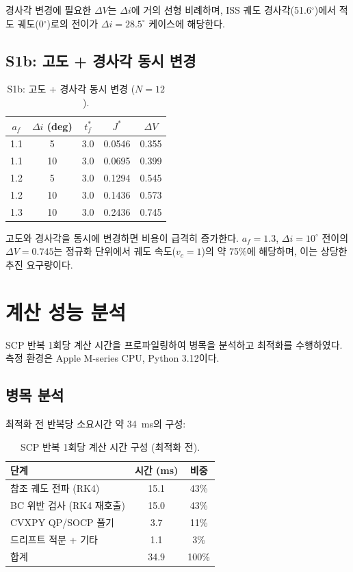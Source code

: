 \documentclass[11pt]{article}
\begin{document}
경사각 변경에 필요한 $\Delta V$는 $\Delta i$에 거의 선형 비례하며,
ISS 궤도 경사각(51.6$^\circ$)에서 적도 궤도(0$^\circ$)로의 전이가
$\Delta i = 28.5^\circ$ 케이스에 해당한다.

\subsection{S1b: 고도 + 경사각 동시 변경}

\begin{table}[h]
\centering
\caption{S1b: 고도 + 경사각 동시 변경 ($N=12$).}
\label{tab:s1b}
\small
\begin{tabular}{@{}ccccc@{}}
\toprule
$a_f$ & $\Delta i$ (deg) & $t_f^*$ & $J^*$ & $\Delta V$ \\
\midrule
1.1 & 5  & 3.0 & 0.0546 & 0.355 \\
1.1 & 10 & 3.0 & 0.0695 & 0.399 \\
1.2 & 5  & 3.0 & 0.1294 & 0.545 \\
1.2 & 10 & 3.0 & 0.1436 & 0.573 \\
1.3 & 10 & 3.0 & 0.2436 & 0.745 \\
\bottomrule
\end{tabular}
\end{table}

고도와 경사각을 동시에 변경하면 비용이 급격히 증가한다.
$a_f=1.3$, $\Delta i=10^\circ$ 전이의 $\Delta V = 0.745$는
정규화 단위에서 궤도 속도($v_c = 1$)의 약 75\%에 해당하며,
이는 상당한 추진 요구량이다.

\section{계산 성능 분석}
\label{sec:performance}

SCP 반복 1회당 계산 시간을 프로파일링하여 병목을 분석하고
최적화를 수행하였다. 측정 환경은 Apple M-series CPU, Python 3.12이다.

\subsection{병목 분석}

최적화 전 반복당 소요시간 약 \SI{34}{\ms}의 구성:

\begin{table}[h]
\centering
\caption{SCP 반복 1회당 계산 시간 구성 (최적화 전).}
\label{tab:perf-before}
\small
\begin{tabular}{@{}lcc@{}}
\toprule
단계 & 시간 (ms) & 비중 \\
\midrule
참조 궤도 전파 (RK4)    & 15.1 & 43\% \\
BC 위반 검사 (RK4 재호출) & 15.0 & 43\% \\
CVXPY QP/SOCP 풀기       & 3.7  & 11\% \\
드리프트 적분 + 기타      & 1.1  & 3\% \\
\midrule
합계                      & 34.9 & 100\% \\
\bottomrule
\end{tabular}
\end{table}
\end{document}
